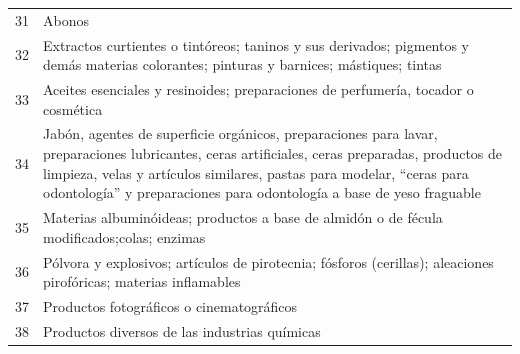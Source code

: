 \documentclass[a4paper,openright,12pt]{book}
\begin{document}
\begin{table}[]
{\begin{tabular}{@{}ll@{}}
    31  & Abonos                                                                                                                                                                                                                                                                                         \\
    32  & Extractos curtientes o tintóreos; taninos y sus derivados; pigmentos y demás materias colorantes; pinturas y barnices; mástiques; tintas                                                                                                                                                       \\
    33  & Aceites esenciales y resinoides; preparaciones de perfumería, tocador o cosmética                                                                                                                                                                                                              \\
    34  & Jabón, agentes de superficie orgánicos, preparaciones para lavar, preparaciones lubricantes, ceras artificiales, ceras preparadas, productos de limpieza, velas y artículos similares, pastas para modelar, “ceras para odontología” y preparaciones para odontología a base de yeso fraguable \\
    35  & Materias albuminóideas; productos a base de almidón o de fécula modificados;colas; enzimas                                                                                                                                                                                                     \\
    36  & Pólvora y explosivos; artículos de pirotecnia; fósforos (cerillas); aleaciones pirofóricas; materias inflamables                                                                                                                                                                               \\
    37  & Productos fotográficos o cinematográficos                                                                                                                                                                                                                                                      \\
    38  & Productos diversos de las industrias químicas                                                                                                                                                                                                                                                  \\

\end{tabular}}
\end{table}
\end{document}
